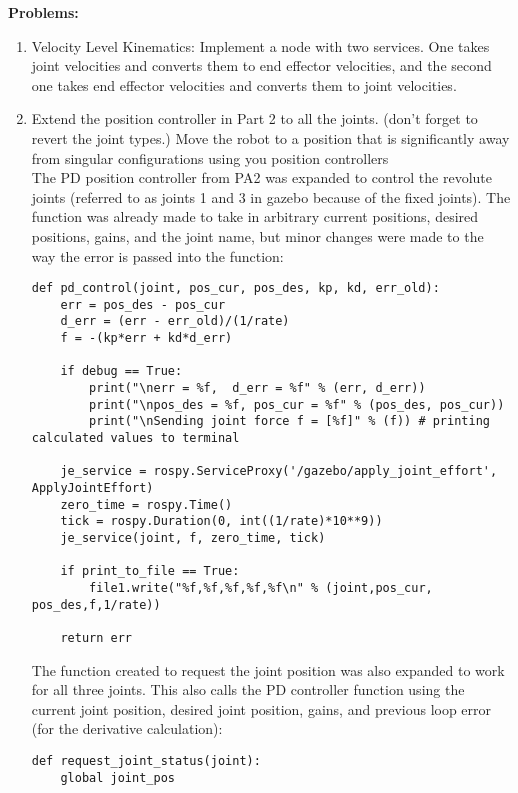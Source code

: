 \documentclass[10pt]{article}
\begin{document}
\textbf{Problems:}
\begin{enumerate}
	\item Velocity Level Kinematics: Implement a node with two services. One takes joint velocities and converts them to end effector velocities, and the second one takes end effector velocities and converts them to joint velocities.
	
	\item Extend the position controller in Part 2 to all the joints. (don't forget to revert the joint types.) Move the robot to a position that is significantly away from singular configurations using you position controllers
	\\
	
	The PD position controller from PA2 was expanded to control the revolute joints (referred to as joints 1 and 3 in gazebo because of the fixed joints). The function was already made to take in arbitrary current positions, desired positions, gains, and the joint name, but minor changes were made to the way the error is passed into the function:
		
\begin{lstlisting}[style=Matlab-editor,basicstyle=\mlttfamily,escapechar=`]
def pd_control(joint, pos_cur, pos_des, kp, kd, err_old):
	err = pos_des - pos_cur
	d_err = (err - err_old)/(1/rate)
	f = -(kp*err + kd*d_err)
	
	if debug == True:
		print("\nerr = %f,  d_err = %f" % (err, d_err))
		print("\npos_des = %f, pos_cur = %f" % (pos_des, pos_cur))
		print("\nSending joint force f = [%f]" % (f)) # printing calculated values to terminal
	
	je_service = rospy.ServiceProxy('/gazebo/apply_joint_effort', ApplyJointEffort)
	zero_time = rospy.Time()
	tick = rospy.Duration(0, int((1/rate)*10**9))
	je_service(joint, f, zero_time, tick)
	
	if print_to_file == True:
		file1.write("%f,%f,%f,%f,%f\n" % (joint,pos_cur, pos_des,f,1/rate)) 
	
	return err
\end{lstlisting} 

	The function created to request the joint position was also expanded to work for all three joints. This also calls the PD controller function using the current joint position, desired joint position, gains, and previous loop error (for the derivative calculation):
		
\begin{lstlisting}[style=Matlab-editor,basicstyle=\mlttfamily,escapechar=`]
def request_joint_status(joint):
	global joint_pos
	

\end{lstlisting}
\end{enumerate}
\end{document}
